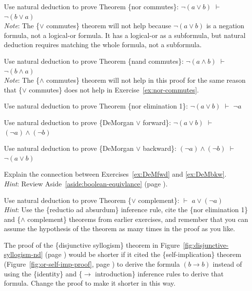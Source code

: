 {{\begin{ExerciseList}
\Exercise\label{ex:nor-commutes}
Use natural deduction to prove
Theorem
\{nor commutes\}: $\neg (a \vee b)$ $\vdash$ $\neg (b \vee a)$\\
\emph{Note}: The \{$\vee$ commutes\} theorem will not help because
$\neg (a \vee b)$ is a negation formula, not a logical-or formula.
It has a logical-or as a subformula, but natural deduction
requires matching the whole formula, not a subformula.

\Exercise
Use natural deduction to prove
Theorem
 \{nand commutes\}: $\neg (a \wedge b)$ $\vdash$ $\neg (b \wedge a)$\\
\emph{Note}: The \{$\wedge$ commutes\} theorem will not help in this proof
for the same reason that \{$\vee$ commutes\} does not help
in Exercise~\ref{ex:nor-commutes}.

\Exercise
Use natural deduction to prove
Theorem
\{nor elimination 1\}: $\neg (a \vee b)$ $\vdash$ $\neg a$

\Exercise
\label{ex:DeMfwd}
Use natural deduction to prove
\{DeMorgan $\vee$ forward\}:
$\neg (a \vee b)$ $\vdash$ $(\neg a) \wedge (\neg b)$

\Exercise
\label{ex:DeMbkw}
Use natural deduction to prove
\{DeMorgan $\vee$ backward\}:
$(\neg a) \wedge (\neg b)$ $\vdash$ $\neg (a \vee b)$

\Exercise
Explain the connection between Exercises~\ref{ex:DeMfwd} and \ref{ex:DeMbkw}.\\
\emph{Hint}: Review Aside~\ref{aside:boolean-equivlance} (page \pageref{aside:boolean-equivlance}).


\Exercise
Use natural deduction to prove
Theorem \{$\vee$ complement\}: $\vdash$ $a \vee (\neg a)$ \\
\emph{Hint}: Use the \{reductio ad absurdum\} inference rule,
cite the \{nor elimination 1\} and \{$\wedge$ complement\}
theorems from earlier exercises,
and remember that you can assume the hypothesis
of the theorem as many times in the proof as you like.

\Exercise
The proof of the \{disjunctive syllogism\} theorem in Figure~\ref{fig:disjunctive-syllogism-nd}
(page \pageref{fig:disjunctive-syllogism-nd})
would be shorter if it cited the \{self-implication\} theorem
(Figure~\ref{fig:or-self-imp-proof}, page \pageref{fig:or-self-imp-proof})
to derive the formula $(b \rightarrow b)$ instead of using the
\{identity\} and \{$\rightarrow$ introduction\} inference rules
to derive that formula.
Change the proof to make it shorter in this way.


\end{ExerciseList}}}
